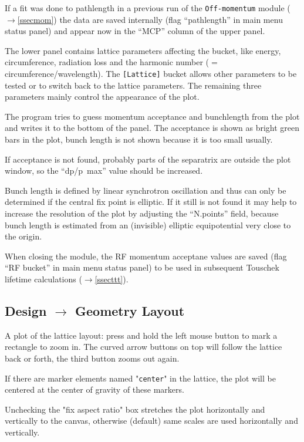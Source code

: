 \documentclass[12pt]{article}
\newcommand{\see}{\mbox{$\rightarrow$}}
\begin{document}
If a fit was done to pathlength in a previous run of the {\tt Off-momentum} module (\see\ref{ssecmom}) the data are saved internally (flag ``pathlength'' in main menu status panel) and appear now in the ``MCP'' column of the upper panel.

The lower panel contains lattice parameters affecting the bucket, like energy, circumference, radiation loss and the harmonic number ($=$ circumference/wavelength). The {\tt [Lattice]} bucket allows other parameters to be tested or to switch back to the lattice parameters. The remaining three parameters mainly control the appearance of the plot. 

The program tries to guess momentum acceptance and bunchlength from the plot and writes it to the bottom of the panel. The acceptance is shown as bright green bars in the plot, bunch length is not shown because it is too small usually.

If acceptance is not found, probably parts of the separatrix are outside the plot window, so the ``dp/p~max'' value should be increased.

Bunch length is defined by linear synchrotron oscillation and thus can only be determined if the central fix point is elliptic. If it still is not found it may help to increase the resolution of the plot by adjusting the ``N.points'' field, because bunch length is estimated from an (invisible) elliptic equipotential very close to the origin.

When closing the module, the RF momentum acceptane values are saved (flag ``RF bucket'' in main menu status panel) to be used in subsequent Touschek lifetime calculations (\see\ref{ssecttt}).







\subsection{Design $\longrightarrow$ Geometry Layout}
A plot of the lattice layout: press and hold the left mouse button to
mark a rectangle to zoom in. The curved arrow buttons on top will follow
the lattice back or forth, the third button zooms out again.

If there are marker elements named "{\tt center}" in the lattice, the plot will be centered
at the center of gravity of these markers.

Unchecking the "fix aspect ratio" box stretches the plot horizontally and vertically to
the canvas, otherwise (default) same scales are used horizontally and vertically.
\end{document}
